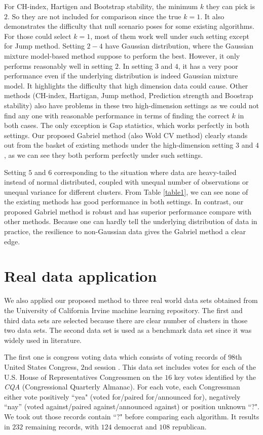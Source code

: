 \documentclass[12pt]{article}
\begin{document}
For CH-index, Hartigen and Bootstrap stability, the minimum $k$ they can pick is $2$. So they are not
included for comparison since the true $k=1$. It also demonstrates the difficulty 
that null scenario poses for some existing algorithms. For those could select $k=1$,
most of them work well under such setting except for Jump method. Setting $2-4$ have Gaussian
distribution, where the Gaussian mixture model-based method suppose to
perform the best. However, it only performs reasonably well in setting $2$. In setting $3$ and $4$,
it has a very poor performance even if the underlying distribution is indeed
Gaussian mixture model. It highlights the difficulty that high dimension
data could cause. Other methods (CH-index, Hartigan, Jump
method, Prediction strength and Boostrap stability) also have problems in
these two high-dimension settings as we could not find any one with reasonable
performance in terms of finding the correct $k$ in both cases. The only exception is
Gap statistics, which works perfectly in both settings. Our proposed Gabriel method (also Wold
CV method) clearly stands out from the basket of existing methods under the 
high-dimension setting $3$ and $4$, as we can see they both perform perfectly under
such settings. 

Setting $5$ and $6$ corresponding to the situation where data are heavy-tailed
instead of normal distributed, coupled with unequal number of observations or
unequal variance for different clusters. From Table \ref{table1}, we can see none of 
the existing methods has good performance in both settings. In contrast,
our proposed Gabriel method is robust and has superior performance
compare with other methods. Because one can hardly tell the underlying
distribution of data in practice, the resilience to non-Gaussian data gives
the Gabriel method a clear edge. 
\section{Real data application}
We also applied our proposed method to three real world data sets obtained
from the University of California Irvine machine learning repository. The
first and third data sets are selected because there are clear number of
clusters in those two data sets. The second data set is used as a benchmark
data set since it was widely used in literature.

The first one is congress voting data which consists of voting records of
$98$th United States Congress, $2$nd session \citep{schlimmer1987concept}. 
This data set includes votes for each of the U.S. House of Representatives Congressmen on the $16$ key votes
identified by the \textit{CQA} (Congressional Quarterly Almanac). For each
vote, each Congressman either vote positively ``yea" (voted for/paired
for/announced for),  negatively ``nay'' (voted against/paired
against/announced against) or position unknown ``?". We took out those records
contain ``?" before comparing each algorithm. It results in $232$ remaining
records, with $124$ democrat and $108$ republican. 
\end{document}
